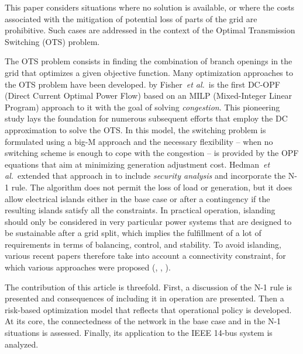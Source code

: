 This paper considers situations where no solution is available, or where the costs associated with the mitigation of potential loss of parts of the grid are prohibitive. Such cases
are addressed in the context of the Optimal Transmission Switching (OTS) problem.

The OTS problem consists in finding the combination of branch openings in the grid
that optimizes a given objective function. Many optimization approaches to the
OTS problem have been developed. \cite{fisherOptimalTransmissionSwitching2008} by
Fisher~\emph{et al.}~is the first DC-OPF (Direct Current Optimal Power Flow) based on an MILP (Mixed-Integer
Linear Program) approach to it with the goal of solving \emph{congestion}.
This pioneering study lays the foundation for numerous subsequent efforts that employ
the DC approximation to solve the OTS. In this model, the switching problem is
formulated using a big-M approach and the necessary flexibility -- when no
switching scheme is enough to cope with the congestion -- is provided by the OPF
equations that aim at minimizing generation adjustment cost. Hedman~\emph{et al.}~extended
that approach in \cite{hedmanOptimalTransmissionSwitching2009} to include \emph{security
analysis} and incorporate the N-1 rule. The algorithm does not permit the loss of load or generation, but it does allow electrical islands either in the
base case or after a contingency if the resulting islands satisfy all the constraints.
 In practical operation, islanding should
only be considered in very particular power systems that are designed to be sustainable
after a grid split, which implies the fulfillment of a lot of
requirements in terms of balancing, control, and stability. To avoid islanding, various recent papers therefore  take into account a connectivity constraint, for which various approaches were proposed (\cite{ostrowskiTransmissionSwitchingConnectivityEnsuring2014}, \cite{hanEnsuringNetworkConnectedness2021}, \cite{liConnectivityConstrainedMILP2021}). 

The contribution of this article is threefold. First, a discussion of the N-1 rule
is presented and consequences of including it in operation are presented. Then
a risk-based optimization model that reflects that operational policy is developed. At its
core, the connectedness of the network in the base case and in the N-1
situations is assessed. Finally, its application to the IEEE 14-bus system is
analyzed.